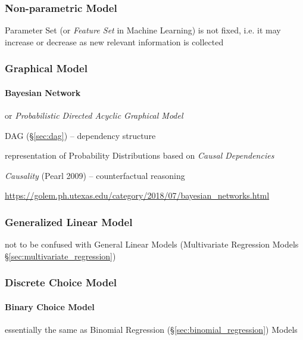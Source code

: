 \subsubsection{Non-parametric Model}\label{sec:nonparametric_model}

Parameter Set (or \emph{Feature Set} in Machine Learning) is not fixed, i.e. it
may increase or decrease as new relevant information is collected



\subsubsection{Graphical Model}\label{sec:graphical_model}

\paragraph{Bayesian Network}\label{sec:bayesian_network}\hfill

or \emph{Probabilistic Directed Acyclic Graphical Model}

DAG (\S\ref{sec:dag}) -- dependency structure

representation of Probability Distributions based on \emph{Causal Dependencies}

\emph{Causality} (Pearl 2009) -- counterfactual reasoning

\url{https://golem.ph.utexas.edu/category/2018/07/bayesian_networks.html}



\subsubsection{Generalized Linear Model}\label{sec:generalized_linear_model}

not to be confused with General Linear Models (Multivariate Regression Models
\S\ref{sec:multivariate_regression})



\subsubsection{Discrete Choice Model}\label{sec:discrete_choice_model}

\paragraph{Binary Choice Model}\label{sec:binary_choice}\hfill

essentially the same as Binomial Regression
(\S\ref{sec:binomial_regression}) Models




